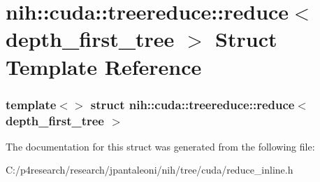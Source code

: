 \hypertarget{structnih_1_1cuda_1_1treereduce_1_1reduce_3_01depth__first__tree_01_4}{
\section{nih\-:\-:cuda\-:\-:treereduce\-:\-:reduce$<$ depth\-\_\-first\-\_\-tree $>$ \-Struct \-Template \-Reference}
\label{structnih_1_1cuda_1_1treereduce_1_1reduce_3_01depth__first__tree_01_4}
}
\subsubsection*{template$<$$>$ struct nih\-::cuda\-::treereduce\-::reduce$<$ depth\-\_\-first\-\_\-tree $>$}



\-The documentation for this struct was generated from the following file\-:\begin{DoxyCompactItemize}
\item 
\-C\-:/p4research/research/jpantaleoni/nih/tree/cuda/reduce\-\_\-inline.\-h\end{DoxyCompactItemize}

